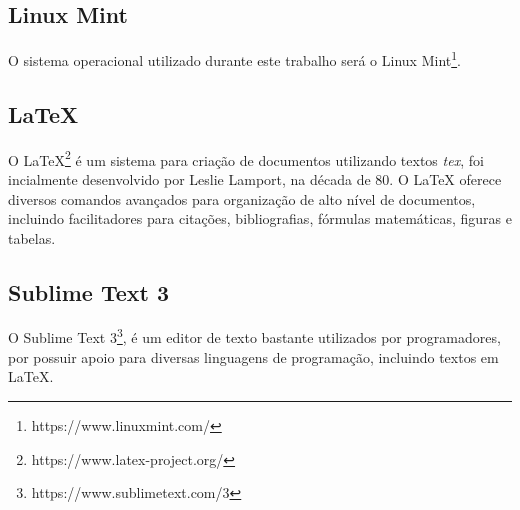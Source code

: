 	\subsection{Linux Mint} %
	\label{sub:linux_mint}
		O sistema operacional utilizado durante este trabalho será o Linux Mint\footnote{https://www.linuxmint.com/}.

	\subsection{LaTeX} %
	\label{sub:latex}
	
	O LaTeX\footnote{https://www.latex-project.org/} é um sistema para criação de documentos utilizando textos \textit{tex}, foi incialmente desenvolvido por Leslie Lamport, na década de 80. O LaTeX oferece diversos comandos avançados para organização de alto nível de documentos, incluindo facilitadores para citações, bibliografias, fórmulas matemáticas, figuras e tabelas.

	\subsection{Sublime Text 3} %
	\label{sub:sublime_text_3}
		O Sublime Text 3\footnote{https://www.sublimetext.com/3}, é um editor de texto bastante utilizados por programadores, por possuir apoio para diversas linguagens de programação, incluindo textos em LaTeX.

	
	


